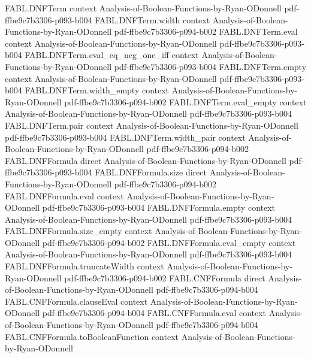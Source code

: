 \begin{theorem}
\proofstep
  {FABL.DNFTerm}
  {context}
  {Analysis-of-Boolean-Functions-by-Ryan-ODonnell}
  {pdf-ffbe9c7b3306-p093-b004}
\proofstep
  {FABL.DNFTerm.width}
  {context}
  {Analysis-of-Boolean-Functions-by-Ryan-ODonnell}
  {pdf-ffbe9c7b3306-p094-b002}
\proofstep
  {FABL.DNFTerm.eval}
  {context}
  {Analysis-of-Boolean-Functions-by-Ryan-ODonnell}
  {pdf-ffbe9c7b3306-p093-b004}
\proofstep
  {FABL.DNFTerm.eval_eq_neg_one_iff}
  {context}
  {Analysis-of-Boolean-Functions-by-Ryan-ODonnell}
  {pdf-ffbe9c7b3306-p093-b004}
\proofstep
  {FABL.DNFTerm.empty}
  {context}
  {Analysis-of-Boolean-Functions-by-Ryan-ODonnell}
  {pdf-ffbe9c7b3306-p093-b004}
\proofstep
  {FABL.DNFTerm.width_empty}
  {context}
  {Analysis-of-Boolean-Functions-by-Ryan-ODonnell}
  {pdf-ffbe9c7b3306-p094-b002}
\proofstep
  {FABL.DNFTerm.eval_empty}
  {context}
  {Analysis-of-Boolean-Functions-by-Ryan-ODonnell}
  {pdf-ffbe9c7b3306-p093-b004}
\proofstep
  {FABL.DNFTerm.pair}
  {context}
  {Analysis-of-Boolean-Functions-by-Ryan-ODonnell}
  {pdf-ffbe9c7b3306-p093-b004}
\proofstep
  {FABL.DNFTerm.width_pair}
  {context}
  {Analysis-of-Boolean-Functions-by-Ryan-ODonnell}
  {pdf-ffbe9c7b3306-p094-b002}
\proofstep
  {FABL.DNFFormula}
  {direct}
  {Analysis-of-Boolean-Functions-by-Ryan-ODonnell}
  {pdf-ffbe9c7b3306-p093-b004}
\proofstep
  {FABL.DNFFormula.size}
  {direct}
  {Analysis-of-Boolean-Functions-by-Ryan-ODonnell}
  {pdf-ffbe9c7b3306-p094-b002}
\proofstep
  {FABL.DNFFormula.eval}
  {context}
  {Analysis-of-Boolean-Functions-by-Ryan-ODonnell}
  {pdf-ffbe9c7b3306-p093-b004}
\proofstep
  {FABL.DNFFormula.empty}
  {context}
  {Analysis-of-Boolean-Functions-by-Ryan-ODonnell}
  {pdf-ffbe9c7b3306-p093-b004}
\proofstep
  {FABL.DNFFormula.size_empty}
  {context}
  {Analysis-of-Boolean-Functions-by-Ryan-ODonnell}
  {pdf-ffbe9c7b3306-p094-b002}
\proofstep
  {FABL.DNFFormula.eval_empty}
  {context}
  {Analysis-of-Boolean-Functions-by-Ryan-ODonnell}
  {pdf-ffbe9c7b3306-p093-b004}
\proofstep
  {FABL.DNFFormula.truncateWidth}
  {context}
  {Analysis-of-Boolean-Functions-by-Ryan-ODonnell}
  {pdf-ffbe9c7b3306-p094-b002}
\proofstep
  {FABL.CNFFormula}
  {direct}
  {Analysis-of-Boolean-Functions-by-Ryan-ODonnell}
  {pdf-ffbe9c7b3306-p094-b004}
\proofstep
  {FABL.CNFFormula.clauseEval}
  {context}
  {Analysis-of-Boolean-Functions-by-Ryan-ODonnell}
  {pdf-ffbe9c7b3306-p094-b004}
\proofstep
  {FABL.CNFFormula.eval}
  {context}
  {Analysis-of-Boolean-Functions-by-Ryan-ODonnell}
  {pdf-ffbe9c7b3306-p094-b004}
\proofstep
  {FABL.CNFFormula.toBooleanFunction}
  {context}
  {Analysis-of-Boolean-Functions-by-Ryan-ODonnell}

\end{theorem}
